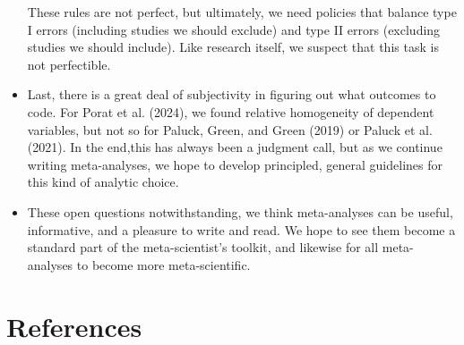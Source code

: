 \documentclass{article}
\begin{document}
\begin{itemize}
{    These rules are not perfect, but ultimately, we need policies that
    balance type I errors (including studies we should exclude) and type
    II errors (excluding studies we should include). Like research
    itself, we suspect that this task is not perfectible.}
\item
  Last, there is a great deal of subjectivity in figuring out what
  outcomes to code. For Porat et al. (2024), we found relative
  homogeneity of dependent variables, but not so for Paluck, Green, and
  Green (2019) or Paluck et al. (2021). In the end,this has always been
  a judgment call, but as we continue writing meta-analyses, we hope to
  develop principled, general guidelines for this kind of analytic
  choice.
\item
  These open questions notwithstanding, we think meta-analyses can be
  useful, informative, and a pleasure to write and read. We hope to see
  them become a standard part of the meta-scientist's toolkit, and
  likewise for all meta-analyses to become more meta-scientific.
\end{itemize}

\section*{References}\label{references}
\end{document}
